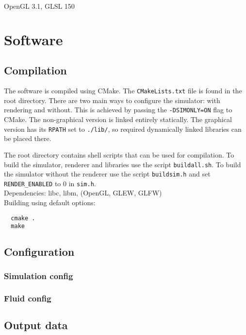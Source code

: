 \documentclass[12pt]{article}
\begin{document}
OpenGL 3.1, GLSL 150

\section{Software}

\subsection{Compilation}

The software is compiled using CMake. The \verb|CMakeLists.txt| file is found in the root directory. There are two main ways to configure the simulator: with rendering and without. This is achieved by passing the \verb|-DSIMONLY=ON| flag to CMake. The non-graphical version is linked entirely statically. The graphical version has its \verb|RPATH| set to \verb|./lib/|, so required dynamically linked libraries can be placed there.

The root directory contains shell scripts that can be used for compilation. To build the simulator, renderer and libraries use the script \verb|buildall.sh|. To build the simulator without the renderer use the script \verb|buildsim.h| and set \verb|RENDER_ENABLED| to 0 in \verb|sim.h|.\\

Dependencies: libc, libm, (OpenGL, GLEW, GLFW)\\

Building using default options:

\begin{verbatim}
  cmake .
  make
\end{verbatim}

\subsection{Configuration}

\subsubsection{Simulation config}

\subsubsection{Fluid config}

\subsection{Output data}
\end{document}
